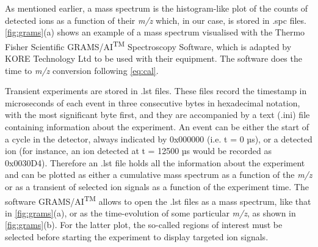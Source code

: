 As mentioned earlier, a mass spectrum is the histogram-like plot of the counts of detected ions as a function of their \textit{m/z} which, in our case, is stored in .spc files.
\autoref{fig:grams}(a) shows an example of a mass spectrum visualised with the Thermo Fisher Scientific\textsuperscript{\textregistered}  GRAMS/AI\textsuperscript{TM}  Spectroscopy Software, which is adapted by KORE Technology Ltd to be used with their equipment.
The software does the time to \textit{m/z} conversion following \autoref{eq:cal}.


Transient experiments are stored in %
.lst files.
 These %
 files  record the timestamp in microseconds of each event in three consecutive bytes in hexadecimal notation, with the most significant byte first, and they are accompanied by a text  (.ini) file containing information about the experiment.
An event can be either the start of a cycle in the detector, always indicated by 0x000000 (i.e. t = 0 µs), or a detected ion (for instance, an ion detected at t = 12500 µs would be recorded as 0x0030D4).
 Therefore an .lst file holds all the information about the experiment and can be plotted as either a cumulative mass spectrum as a function of the \textit{m/z} or as a transient of selected ion signals as a function of the experiment time.
The software GRAMS/AI\textsuperscript{TM} allows to open the .lst files as a mass spectrum, like that in \autoref{fig:grams}(a), or as the time-evolution of some particular \textit{m/z}, as shown in \autoref{fig:grams}(b). For the latter plot, the so-called regions of interest must be selected before starting the experiment 
to display targeted ion signals. 




